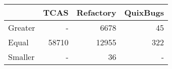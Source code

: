 \begin{tabular}{lrrr}
\toprule
 & \textbf{TCAS} & \textbf{Refactory} & \textbf{QuixBugs} \\
\midrule
Greater & - & 6678 & 45 \\
Equal & 58710 & 12955 & 322 \\
Smaller & - & 36 & - \\
\bottomrule
\end{tabular}
